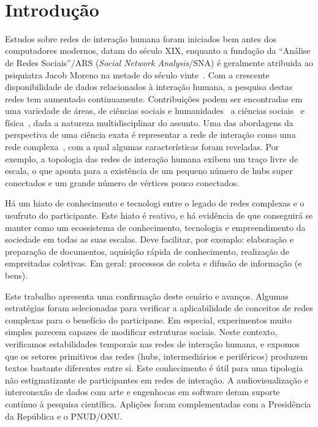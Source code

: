 \documentclass[a4paper,openright,12pt]{report} %
\begin{document}
\newpage\ \thispagestyle{empty}  \newpage\thispagestyle{empty}

\tableofcontents\thispagestyle{empty}\thispagestyle{empty}%

\clearpage \thispagestyle{empty}

\pagestyle{fancy}

\chapter{Introdução}
Estudos sobre redes de interação humana foram iniciados bem antes dos computadores modernos,
datam do século XIX, enquanto a fundação da ``Análise de Redes Sociais''/ARS (\emph{Social Network Analysis}/SNA)
é geralmente atribuida ao psiquiatra Jacob Moreno na metade do século vinte~\cite{newmanBook}.
Com a crescente disponibilidade de dados relacionados à interação humana, a pesquisa destas redes tem aumentado continuamente.
Contribuições podem ser encontradas em uma variedade de áreas, de ciências sociais e humanidades~\cite{latour2013}
a ciências sociais~\cite{bird} e física~\cite{barabasiHumanDyn,newmanFriendship},
dada a natureza multidisciplinar do assunto.
Uma das abordagens da perspectiva de uma ciência exata é representar a rede de interação como uma rede
complexa~\cite{barabasiHumanDyn,newmanFriendship},
com a qual algumas características foram reveladas.
Por exemplo, a topologia das redes de interação humana exibem um traço livre de escala,
o que aponta para a existência de um pequeno número de hubs super conectados
e um grande número de vértices pouco conectados.

Há um hiato de conhecimento e tecnologi entre o legado de redes complexas e o usufruto do participante.
Este hiato é reativo, e há evidência de que conseguirá se manter como um ecossistema de conhecimento, tecnologia
e empreendimento da sociedade em todas as suas escalas.
Deve facilitar, por exemplo:
elaboração e preparação de documentos, aquisição rápida de conhecimento,
realização de empreitadas coletivas.
Em geral: processos de coleta e difusão de informação (e bens).

Este trabalho apresenta uma confirmação deste cenário e avanços.
Algumas estratégias foram selecionadas para verificar a aplicabilidade
de conceitos de redes complexas para o benefício do participane.
Em especial, experimentos muito simples parecem capazes de modificar
estruturas sociais. Neste contexto, verificamos estabilidades temporais
nas redes de interação humana, e expomos que os setores primitivos
das redes (hubs, intermediários e periféricos)
produzem textos bastante diferentes entre si.
Este conhecimento é útil para uma tipologia não estigmatizante
de participantes em redes de interação.
A audiovisualização e interconexão de dados com arte e engenhocas
em software deram suporte contínuo à pesquisa científica.
Aplições foram complementadas com a Presidência da República
e o PNUD/ONU.
\end{document}
